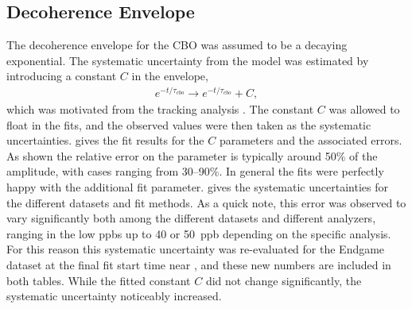 \clearpage
\subsection{Decoherence Envelope}


The decoherence envelope for the CBO was assumed to be a decaying exponential. The systematic uncertainty from the model was estimated by introducing a constant $C$ in the envelope,
    \begin{align}
        e^{-t/\tau_{cbo}} \rightarrow e^{-t/\tau_{cbo}} + C,
    \end{align}
which was motivated from the tracking analysis \cite{phdthesis:2020Kinnaird}. The constant $C$ was allowed to float in the fits, and the observed \DR values were then taken as the systematic uncertainties.  gives the fit results for the $C$ parameters and the associated errors. As shown the relative error on the parameter is typically around 50\% of the amplitude, with cases ranging from 30--90\%. In general the fits were perfectly happy with the additional fit parameter.  gives the systematic uncertainties for the different datasets and fit methods. As a quick note, this error was observed to vary significantly both among the different datasets and different analyzers, ranging in the low ppbs up to 40 or 50~ppb depending on the specific analysis. For this reason this systematic uncertainty was re-evaluated for the Endgame dataset at the final fit start time near , and these new numbers are included in both tables. While the fitted constant $C$ did not change significantly, the systematic uncertainty noticeably increased.


